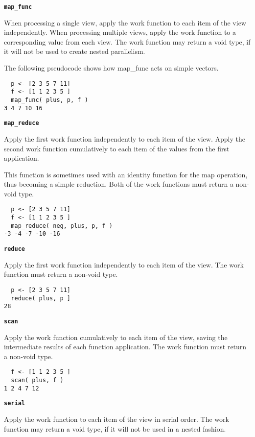 \documentclass{report}
\begin{document}
\texttt{{\bf map\_func }}

When processing a single view, apply the work function to each
item of the view independently.  When processing multiple views,
apply the work function to a corresponding value from each view.
The work function may return a void type, if it will not be used
to create nested parallelism.

The following pseudocode shows how map\_func acts on simple vectors.

\begin{verbatim}
  p <- [2 3 5 7 11]
  f <- [1 1 2 3 5 ]
  map_func( plus, p, f )
3 4 7 10 16
\end{verbatim}

\texttt{{\bf map\_reduce }}

Apply the first work function independently to each item of the view.
Apply the second work function cumulatively to each item of the values from
the first application.

This function is sometimes used with an identity function for
the map operation, thus becoming a simple reduction.
Both of the work functions must return a non-void type.

\begin{verbatim}
  p <- [2 3 5 7 11]
  f <- [1 1 2 3 5 ]
  map_reduce( neg, plus, p, f )
-3 -4 -7 -10 -16
\end{verbatim}

\texttt{{\bf reduce }}

Apply the first work function independently to each item of the view.
The work function must return a non-void type.

\begin{verbatim}
  p <- [2 3 5 7 11]
  reduce( plus, p ]
28
\end{verbatim}

\texttt{{\bf scan }}

Apply the work function cumulatively to each item of the view,
saving the intermediate results of each function application.
The work function must return a non-void type.

\begin{verbatim}
  f <- [1 1 2 3 5 ]
  scan( plus, f )
1 2 4 7 12
\end{verbatim}

\texttt{{\bf serial }}

Apply the work function to each item of the view in serial order.
The work function may return a void type, if it will not be used
in a nested fashion.
\end{document}
